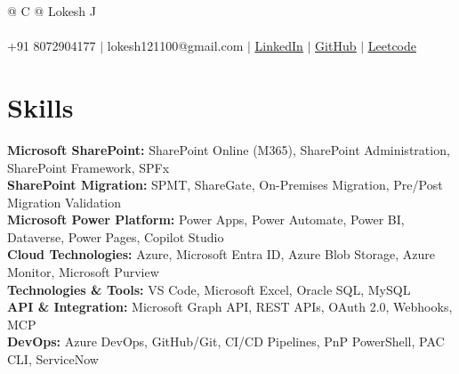 \documentclass[a4paper,8pt]{article}
\begin{document}
\pagestyle{empty} 


\begin{tabularx}{\linewidth}{@{} C @{}}
\color[HTML]{1C033C} \Huge{Lokesh J} \\[6pt]
\\
\textcolor[HTML]{371e77}{{{{\faMobile} +91 8072904177}} $|$}
\textcolor[HTML]{371e77}{{{{\faEnvelope} lokesh121100@gmail.com}} $|$}
\textcolor[HTML]{371e77}{\href{https://www.linkedin.com/in/lokesh-j-2a126432a}{\underline{{\raisebox{-0.05\height}{\faLinkedin} LinkedIn}}} $|$}
\textcolor[HTML]{371e77}{\href{https://github.com/Lokesh121100}{\underline{{\raisebox{-0.05\height}{\faGithub} GitHub}}} $|$}
\textcolor[HTML]{371e77}{\href{https://leetcode.com/u/lokesh1211/}{\underline{{\raisebox{-0.05\height}{\faCode} Leetcode}}}}
\end{tabularx}

\section{Skills}
\color[HTML]{1C033C}\textbf{Microsoft SharePoint:} SharePoint Online (M365), SharePoint Administration, SharePoint Framework, SPFx\\
\color[HTML]{1C033C}\textbf{SharePoint Migration:} SPMT, ShareGate, On-Premises Migration, Pre/Post Migration Validation\\
\color[HTML]{1C033C}\textbf{Microsoft Power Platform:} Power Apps, Power Automate, Power BI, Dataverse, Power Pages, Copilot Studio\\
\color[HTML]{1C033C}\textbf{Cloud Technologies:} Azure, Microsoft Entra ID, Azure Blob Storage, Azure Monitor, Microsoft Purview\\
\color[HTML]{1C033C}\textbf{Technologies \& Tools:} VS Code, Microsoft Excel, Oracle SQL, MySQL\\
\color[HTML]{1C033C}\textbf{API \& Integration:} Microsoft Graph API, REST APIs, OAuth 2.0, Webhooks, MCP\\
\color[HTML]{1C033C}\textbf{DevOps:} Azure DevOps, GitHub/Git, CI/CD Pipelines, PnP PowerShell, PAC CLI, ServiceNow\\

\end{document}
